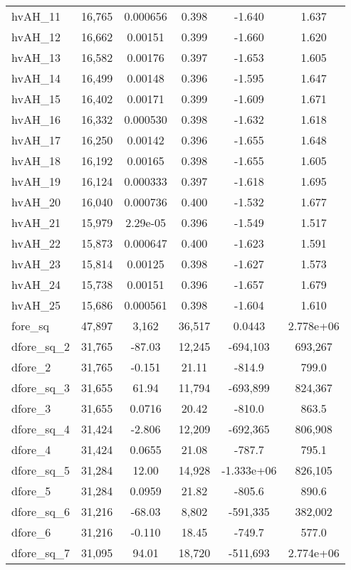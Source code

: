 \documentclass[]{article}
\begin{document}
\begin{center}
\begin{tabular}{lccccc}
hvAH\_11 & 16,765 & 0.000656 & 0.398 & -1.640 & 1.637 \\
hvAH\_12 & 16,662 & 0.00151 & 0.399 & -1.660 & 1.620 \\
hvAH\_13 & 16,582 & 0.00176 & 0.397 & -1.653 & 1.605 \\
hvAH\_14 & 16,499 & 0.00148 & 0.396 & -1.595 & 1.647 \\
hvAH\_15 & 16,402 & 0.00171 & 0.399 & -1.609 & 1.671 \\
hvAH\_16 & 16,332 & 0.000530 & 0.398 & -1.632 & 1.618 \\
hvAH\_17 & 16,250 & 0.00142 & 0.396 & -1.655 & 1.648 \\
hvAH\_18 & 16,192 & 0.00165 & 0.398 & -1.655 & 1.605 \\
hvAH\_19 & 16,124 & 0.000333 & 0.397 & -1.618 & 1.695 \\
hvAH\_20 & 16,040 & 0.000736 & 0.400 & -1.532 & 1.677 \\
hvAH\_21 & 15,979 & 2.29e-05 & 0.396 & -1.549 & 1.517 \\
hvAH\_22 & 15,873 & 0.000647 & 0.400 & -1.623 & 1.591 \\
hvAH\_23 & 15,814 & 0.00125 & 0.398 & -1.627 & 1.573 \\
hvAH\_24 & 15,738 & 0.00151 & 0.396 & -1.657 & 1.679 \\
hvAH\_25 & 15,686 & 0.000561 & 0.398 & -1.604 & 1.610 \\
fore\_sq & 47,897 & 3,162 & 36,517 & 0.0443 & 2.778e+06 \\
dfore\_sq\_2 & 31,765 & -87.03 & 12,245 & -694,103 & 693,267 \\
dfore\_2 & 31,765 & -0.151 & 21.11 & -814.9 & 799.0 \\
dfore\_sq\_3 & 31,655 & 61.94 & 11,794 & -693,899 & 824,367 \\
dfore\_3 & 31,655 & 0.0716 & 20.42 & -810.0 & 863.5 \\
dfore\_sq\_4 & 31,424 & -2.806 & 12,209 & -692,365 & 806,908 \\
dfore\_4 & 31,424 & 0.0655 & 21.08 & -787.7 & 795.1 \\
dfore\_sq\_5 & 31,284 & 12.00 & 14,928 & -1.333e+06 & 826,105 \\
dfore\_5 & 31,284 & 0.0959 & 21.82 & -805.6 & 890.6 \\
dfore\_sq\_6 & 31,216 & -68.03 & 8,802 & -591,335 & 382,002 \\
dfore\_6 & 31,216 & -0.110 & 18.45 & -749.7 & 577.0 \\
dfore\_sq\_7 & 31,095 & 94.01 & 18,720 & -511,693 & 2.774e+06 \\

\end{tabular}
\end{center}
\end{document}
